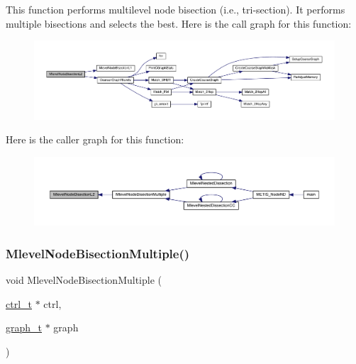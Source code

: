 This function performs multilevel node bisection (i.\+e., tri-\/section). It performs multiple bisections and selects the best. Here is the call graph for this function\+:\nopagebreak
\begin{figure}[H]
\begin{center}
\leavevmode
\includegraphics[width=350pt]{a00945_ac3a0eaeefa34a3865a0be5bb70bd958f_cgraph}
\end{center}
\end{figure}
Here is the caller graph for this function\+:\nopagebreak
\begin{figure}[H]
\begin{center}
\leavevmode
\includegraphics[width=350pt]{a00945_ac3a0eaeefa34a3865a0be5bb70bd958f_icgraph}
\end{center}
\end{figure}
\mbox{\label{a00945_a59c8030c5429e219a8535c2a11cef724}} 
\subsubsection{\texorpdfstring{Mlevel\+Node\+Bisection\+Multiple()}{MlevelNodeBisectionMultiple()}}
{\footnotesize\ttfamily void Mlevel\+Node\+Bisection\+Multiple (\begin{DoxyParamCaption}\item[{\hyperlink{a00742}{ctrl\+\_\+t} $\ast$}]{ctrl,  }\item[{\hyperlink{a00734}{graph\+\_\+t} $\ast$}]{graph }\end{DoxyParamCaption})}

